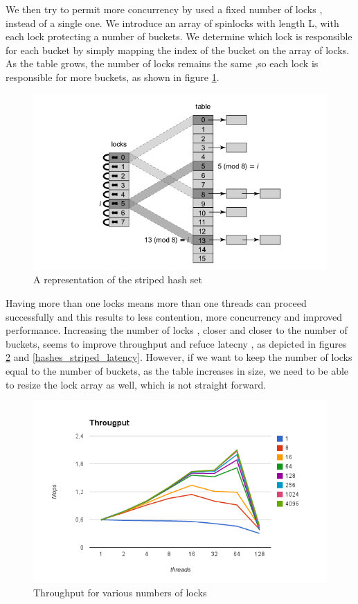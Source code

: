We then try to permit more concurrency by used a fixed number of locks , instead of a single one. We introduce an array of spinlocks with length L, with each lock protecting a number of buckets. We determine which lock is responsible for each bucket by simply mapping the index of the bucket on the array of locks. As the table grows, the number of locks remains the same ,so each lock is responsible for more buckets, as shown in figure \ref{striped_hash_set}.

\begin{figure}
 \centering
  \includegraphics[scale=0.5]{striped_hash_set.png}
\caption{A representation of the striped hash set}
\label{striped_hash_set}
\end{figure}


Having more than one locks means more than one threads can proceed  successfully and this results to less contention, more concurrency and improved performance. Increasing the number of locks , closer and closer to the number of buckets, seems to improve throughput and refuce latecny , as depicted in figures \ref{hashes_striped_through} and \ref{hashes_striped_latency}. However, if we want to keep the number of locks equal to the number of buckets, as the table increases in size, we need to be able to resize the lock array as well, which is not straight forward.

\begin{figure}
 \centering
  \includegraphics[scale=0.7]{hashes_striped_through.png}
\caption{Throughput for various numbers of locks}
\label{hashes_striped_through}
\end{figure}

